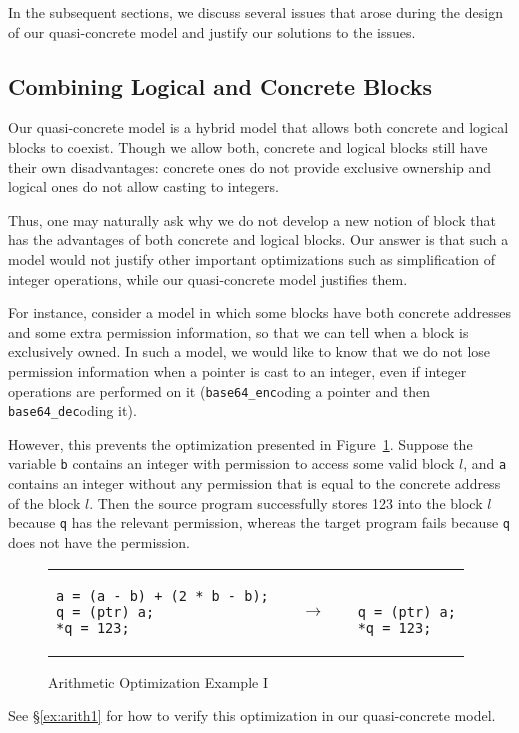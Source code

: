 In the subsequent sections, we discuss several issues that arose during the design of our quasi-concrete model and justify our solutions to the issues.

\subsection{Combining Logical and Concrete Blocks}

Our quasi-concrete model is a hybrid model that allows both concrete and
logical blocks to coexist. Though we allow both, concrete and logical
blocks still have their own disadvantages: concrete ones do not
provide exclusive ownership and logical ones do not allow casting to
integers.

Thus, one may naturally ask why we do not develop a new notion of
block that has the advantages of both concrete and logical blocks.  Our
answer is that such a model would not justify other important
optimizations such as simplification of integer operations,
while our quasi-concrete model justifies them.

For instance, consider a model in which some blocks have both concrete addresses and some extra permission information, so that we can tell when a block is exclusively owned. In such a model, we would like to know that we do not lose permission information when a pointer is cast to an integer, even if integer operations are performed on it (\eg \texttt{base64\_enc}oding a pointer and then \texttt{base64\_dec}oding it).

However, this prevents the optimization presented in Figure~\ref{code:arith1}.
Suppose the variable \texttt{b} contains an integer with permission
  to access some valid block $l$, and \texttt{a} contains an integer
  without any permission that is equal to the concrete address of the
  block $l$. Then the source program successfully stores 123 into the block $l$
   because \texttt{q} has the relevant permission, whereas the target program fails
   because \texttt{q} does not have the permission.
%
\begin{figure}[t]
\center
\begin{tabular}{lll}
\begin{lstlisting}
a = (a - b) + (2 * b - b);
q = (ptr) a;
*q = 123;
\end{lstlisting}
&
$\quad\rightarrow\quad$
&
\begin{lstlisting}

q = (ptr) a;
*q = 123;
\end{lstlisting}
\end{tabular}
\caption{Arithmetic Optimization Example I}\label{code:arith1}
\end{figure}
%
See \S\ref{ex:arith1} for how to verify this optimization in our quasi-concrete model.

